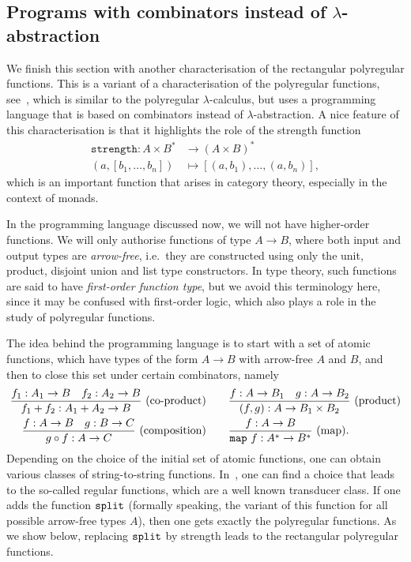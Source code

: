 \subsection{Programs with combinators instead of $\lambda$-abstraction}
We finish this section with another characterisation of the rectangular polyregular functions. This is a variant of a characterisation of the polyregular functions, see~\cite[Section 4]{bojanczykPolyregularFunctions2018}, which is similar to the polyregular $\lambda$-calculus, but uses a programming language that is based on  combinators instead of  $\lambda$-abstraction. A nice feature of this characterisation is that it highlights the role of the strength function 
\begin{align} \label{eq:strength}
        \mathtt{strength} : A \times B^* & \to (A \times B)^* \\
        (a, [b_1,\ldots,b_n]) & \mapsto [(a,b_1),\ldots,(a,b_n)], \nonumber
        \end{align}
which is an important function that arises in category theory, especially in the context of monads.

In the programming language discussed now, we will not have higher-order functions. We will only authorise functions of type $A \to B$, where both input and output types are \emph{arrow-free}, i.e.~they are constructed using only the unit, product, disjoint union and list type constructors. In type theory, such functions are said to have \emph{first-order function type}, but we avoid this terminology here, since it may be confused with first-order logic, which also plays a role in the study of polyregular functions. 

The idea behind the programming language  is to start with a set of atomic functions, which have types of the form $A \to B$ with arrow-free $A$ and $B$, and then to close this set under certain combinators, namely 
\begin{align*}
\frac{f_1 : A_1 \to B \quad f_2 : A_2 \to B}{f_1 + f_2 : A_1 + A_2 \to B}\text{\ (co-product)} \qquad & 
\frac{f : A \to B_1 \quad g : A \to B_2}{(f,g) : A \to B_1 \times B_2}\text{\ (product)} \\
\frac{f : A \to B \quad g : B \to C}{g \circ f : A \to C}\text{\ (composition)} \qquad  & 
\frac{f : A \to B}{\mathtt{map}\ f : A^* \to B^*}\text{\ (map)}.
\end{align*}
Depending on the choice of the initial set of atomic functions, one can obtain various classes of string-to-string functions. In~\cite[Section 6]{bojanczykRegularFirstOrderList2018}, one can find a choice that leads to the so-called regular functions, which are a well known transducer class. If one adds the function $\mathtt{split}$ (formally speaking, the variant of this  function for all possible arrow-free types $A$), then one  gets exactly the polyregular functions. As we show below, replacing $\mathtt{split}$ by strength leads to the rectangular polyregular functions.

